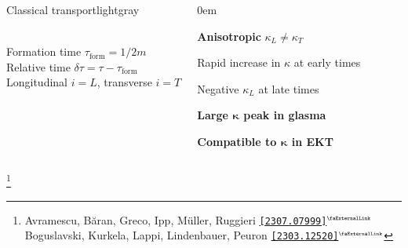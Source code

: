 \documentclass[aspectratio=169,11pt,usenames,dvipsnames]{beamer}
\renewcommand{\thefootnote}{\color{customblue}\faPaperPlaneO}
\newcommand\blfootnote[1]{%
  \begingroup
  \renewcommand\thefootnote{}\footnote{#1}%
  \addtocounter{footnote}{-1}%
  \endgroup
}
\begin{document}
\begin{frame}
\begin{columns}[onlytextwidth,t]
\begin{custombox2}{Classical transport}{lightgray}
\begin{varwidth}{0.95\textwidth}
\begin{itemize}
                \\[5pt]
                {\scriptsize\color{lightgray} Formation time $\tau_\mathrm{form}=1/2m$\\[1pt]
                Relative time $\delta\tau=\tau-\tau_\mathrm{form}$\\[-2pt]
                Longitudinal $i=L$, transverse $i=T$}
            \end{itemize}
            \end{varwidth}
        \end{custombox2}

        \begin{itemize}\itemsep0em 
            \footnotesize
            {\color{lightgray}\item {\bfseries Anisotropic} $\kappa_L\neq\kappa_T$
            \item Rapid increase in $\kappa$ at early times 
            \item Negative $\kappa_L$ at late times}
            \item {\bfseries\color{palgold}Large $\boldsymbol{\kappa}$ peak in glasma}
            \item {\bfseries\color{palviolet}Compatible to $\boldsymbol{\kappa}$ in EKT}
        \end{itemize}    
              
    \end{columns}
    \blfootnote{\scriptsize Avramescu, Băran, Greco, Ipp, Müller, Ruggieri  \href{https://arxiv.org/abs/2307.07999}{{\color{palgold}\texttt{[2307.07999]}$^\text{\tiny\faExternalLink}$}}\\
    \hspace{16.5pt}Boguslavski, Kurkela, Lappi, Lindenbauer, Peuron \href{https://arxiv.org/abs/2303.12520}{{\color{palviolet}\texttt{[2303.12520]}$^\text{\tiny\faExternalLink}$}}
    }
\end{frame}

\end{document}
